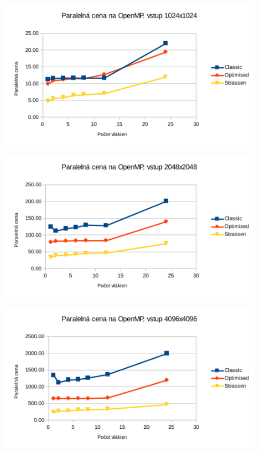 \documentclass[slovak]{article}
\begin{document}
\begin{figure}\centering
	\includegraphics[scale=1]{./images/1024_cena.pdf}
	\label{gr:graf4}
\end{figure}  

\begin{figure}\centering
	\includegraphics[scale=1]{./images/2048_cena.pdf}
	\label{gr:graf5}
\end{figure}  

\begin{figure}\centering
	\includegraphics[scale=1]{./images/4096_cena.pdf}
	\label{gr:graf6}
\end{figure}  
\end{document}
